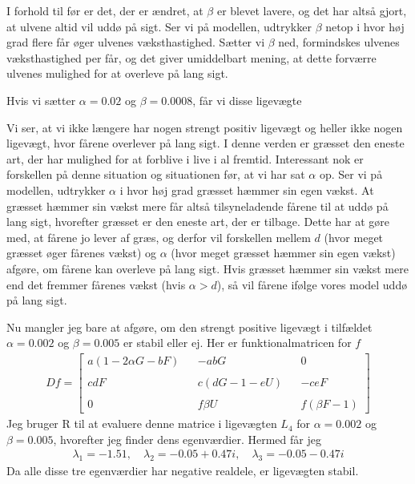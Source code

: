 \documentclass[12pt]{article}
\begin{document}
I forhold til før er det, der er ændret, at $\beta$ er blevet lavere, og det har altså gjort, at ulvene altid vil uddø på sigt. Ser vi på modellen, udtrykker $\beta$ netop i hvor høj grad flere får øger ulvenes væksthastighed. Sætter vi $\beta$ ned, formindskes ulvenes væksthastighed per får, og det giver umiddelbart mening, at dette forværre ulvenes mulighed for at overleve på lang sigt.

Hvis vi sætter $\alpha=0.02$ og $\beta=0.0008$, får vi disse ligevægte
\begin{center}

\end{center}
Vi ser, at vi ikke længere har nogen strengt positiv ligevægt og heller ikke nogen ligevægt, hvor fårene overlever på lang sigt. I denne verden er græsset den eneste art, der har mulighed for at forblive i live i al fremtid. Interessant nok er forskellen på denne situation og situationen før, at vi har sat $\alpha$ op. Ser vi på modellen, udtrykker $\alpha$ i hvor høj grad græsset hæmmer sin egen vækst. At græsset hæmmer sin vækst mere får altså tilsyneladende fårene til at uddø på lang sigt, hvorefter græsset er den eneste art, der er tilbage. Dette har at gøre med, at fårene jo lever af græs, og derfor vil forskellen mellem $d$ (hvor meget græsset øger fårenes vækst) og $\alpha$ (hvor meget græsset hæmmer sin egen vækst) afgøre, om fårene kan overleve på lang sigt. Hvis græsset hæmmer sin vækst mere end det fremmer fårenes vækst (hvis $\alpha>d$), så vil fårene ifølge vores model uddø på lang sigt.

Nu mangler jeg bare at afgøre, om den strengt positive ligevægt i tilfældet $\alpha=0.002$ og $\beta=0.005$ er stabil eller ej. Her er funktionalmatricen for $f$
\begin{align}
Df = \begin{bmatrix}
a(1-2\alpha G - b F) && -abG && 0 \\ \\
cdF && c(dG-1-eU) && -ceF \\ \\ 
0 && f\beta U && f(\beta F - 1)
\end{bmatrix}
\end{align}
Jeg bruger R til at evaluere denne matrice i ligevægten $L_4$ for $\alpha=0.002$ og $\beta=0.005$, hvorefter jeg finder dens egenværdier. Hermed får jeg
\begin{align}
\lambda_1 = -1.51, \quad \lambda_2 = -0.05 + 0.47i, \quad \lambda_3 = -0.05 - 0.47i
\end{align}
Da alle disse tre egenværdier har negative realdele, er ligevægten stabil.
\end{document}
